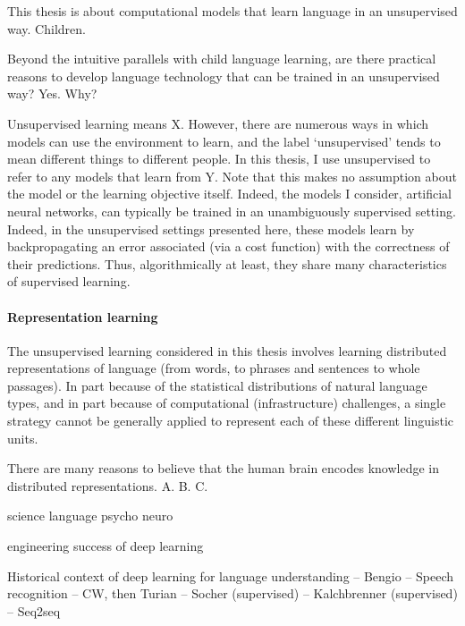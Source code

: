 


This thesis is about computational models that learn language in an unsupervised way. Children. 



Beyond the intuitive parallels with child language learning, are there practical reasons to develop language technology that can be trained in an unsupervised way? Yes. Why?  



Unsupervised learning means X. However, there are numerous ways in which models can use the environment to learn, and the label `unsupervised' tends to mean different things to different people. In this thesis, I use unsupervised to refer to any models that learn from Y. Note that this makes no assumption about the model or the learning objective itself. Indeed, the models I consider, artificial neural networks, can typically be trained in an unambiguously supervised setting. Indeed, in the unsupervised settings presented here, these models learn by backpropagating an error associated (via a cost function) with the correctness of their predictions. Thus, algorithmically at least, they share many characteristics of supervised learning. 


\paragraph{Representation learning} The unsupervised learning considered in this thesis involves learning distributed representations of language (from words, to phrases and sentences to whole passages). In part because of the statistical distributions of natural language types, and in part because of computational (infrastructure) challenges, a single strategy cannot be generally applied to represent each of these different linguistic units. 

There are many reasons to believe that the human brain encodes knowledge in distributed representations. A. B. C. 

science
language
psycho
neuro

engineering
success of deep learning

Historical context of deep learning for language understanding
-- Bengio
-- Speech recognition
-- CW, then Turian
-- Socher (supervised)
-- Kalchbrenner (supervised)
-- Seq2seq

